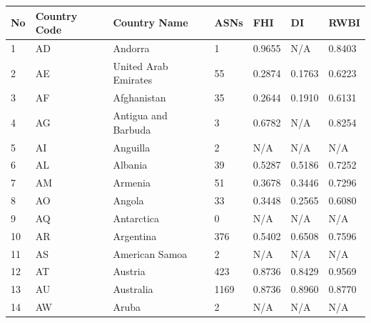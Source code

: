 \documentclass{article}
\begin{document}
\begin{table}
\centering
\caption{Number of ASes and the normalized indexes: Free House Index, Democracy Index and Reporters Without Borders Index)}
\label{tab:data}
\begin{longtable}{|l|l|l|l|l|l|l|}
\hline
No  & Country Code & Country Name                                         & ASNs  & FHI    & DI     & RWBI   \\ \hline
1   & AD           & Andorra                                              & 1     & 0.9655 & N/A    & 0.8403 \\ \hline
2   & AE           & United Arab Emirates                                 & 55    & 0.2874 & 0.1763 & 0.6223 \\ \hline
3   & AF           & Afghanistan                                          & 35    & 0.2644 & 0.1910 & 0.6131 \\ \hline
4   & AG           & Antigua and Barbuda                                  & 3     & 0.6782 & N/A    & 0.8254 \\ \hline
5   & AI           & Anguilla                                             & 2     & N/A    & N/A    & N/A    \\ \hline
6   & AL           & Albania                                              & 39    & 0.5287 & 0.5186 & 0.7252 \\ \hline
7   & AM           & Armenia                                              & 51    & 0.3678 & 0.3446 & 0.7296 \\ \hline
8   & AO           & Angola                                               & 33    & 0.3448 & 0.2565 & 0.6080 \\ \hline
9   & AQ           & Antarctica                                           & 0     & N/A    & N/A    & N/A    \\ \hline
10  & AR           & Argentina                                            & 376   & 0.5402 & 0.6508 & 0.7596 \\ \hline
11  & AS           & American Samoa                                       & 2     & N/A    & N/A    & N/A    \\ \hline
12  & AT           & Austria                                              & 423   & 0.8736 & 0.8429 & 0.9569 \\ \hline
13  & AU           & Australia                                            & 1169  & 0.8736 & 0.8960 & 0.8770 \\ \hline
14  & AW           & Aruba                                                & 2     & N/A    & N/A    & N/A    \\ \hline

\end{longtable}
\end{table}
\end{document}
